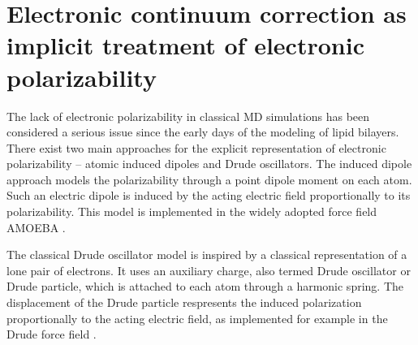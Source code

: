 \section{Electronic continuum correction as implicit treatment of electronic polarizability}
\label{section:ecc}

The lack of electronic polarizability in classical MD simulations
has been considered a serious issue since the early days of the modeling of lipid bilayers. 
There exist two main approaches for the explicit representation of electronic polarizability -- atomic induced dipoles and Drude oscillators.
The induced dipole approach models the polarizability through a point dipole moment on each atom.
Such an electric dipole is induced by the acting electric field proportionally to its polarizability. 
This model is implemented in the widely adopted force field AMOEBA \citep{amoeba06, amoeba10, amoeba13}.

The classical Drude oscillator model is inspired by a classical representation of a lone pair of electrons. 
It uses an auxiliary charge,
also termed Drude oscillator or Drude particle, 
which is attached to each atom through a harmonic spring.
The displacement of the Drude particle respresents the induced polarization proportionally to the acting electric field,
as implemented for example in the Drude force field \citep{lemkul2016empirical}. 

